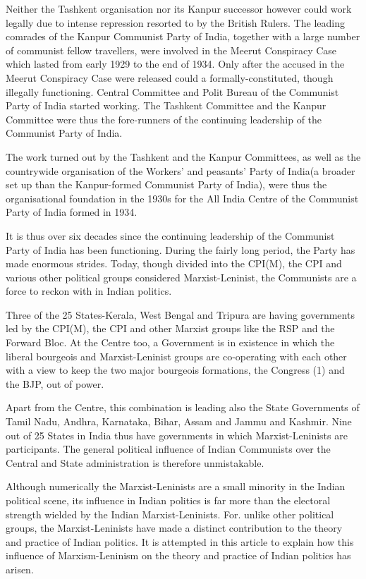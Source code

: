 Neither the Tashkent organisation nor its Kanpur successor however could work legally due to intense repression resorted to by the British Rulers. The leading comrades of the Kanpur Communist Party of India, together with a large number of communist fellow travellers, were involved in the Meerut Conspiracy Case which lasted from early 1929 to the end of 1934. Only after the accused in the Meerut Conspiracy Case were released could a formally-constituted, though illegally functioning. Central Committee and Polit Bureau of the Communist Party of India started working. The Tashkent Committee and the Kanpur Committee were thus the fore-runners of the continuing leadership of the Communist Party of India. 

The work turned out by the Tashkent and the Kanpur Committees, as well as the countrywide organisation of the Workers' and peasants' Party of India(a broader set up than the Kanpur-formed Communist Party of India), were thus the organisational foundation in the 1930s for the All India Centre of the Communist Party of India formed in 1934.

It is thus over six decades since the continuing leadership of the Communist Party of India has been functioning. During the fairly long period, the Party has made enormous strides. Today, though divided into the CPI(M), the CPI and various other political groups considered Marxist-Leninist, the Communists are a force to reckon with in Indian politics. 

Three of the 25 States-Kerala, West Bengal and Tripura are having governments led by the CPI(M), the CPI and other Marxist groups like the RSP and the Forward Bloc. At the Centre too, a Government is in existence in which the liberal bourgeois and Marxist-Leninist groups are co-operating with each other with a view to keep the two major bourgeois formations, the Congress (1) and the BJP, out of power. 

Apart from the Centre, this combination is leading also the State Governments of Tamil Nadu, Andhra, Karnataka, Bihar, Assam and Jammu and Kashmir. Nine out of 25 States in India thus have governments in which Marxist-Leninists are participants. The general political influence of Indian Communists over the Central and State administration is therefore unmistakable. 

Although numerically the Marxist-Leninists are a small minority in the Indian political scene, its influence in Indian politics is far more than the electoral strength wielded by the Indian Marxist-Leninists. For. unlike other political groups, the Marxist-Leninists have made a distinct contribution to the theory and practice of Indian politics. It is attempted in this article to explain how this influence of Marxism-Leninism on 
the theory and practice of Indian politics has arisen.\\ 


